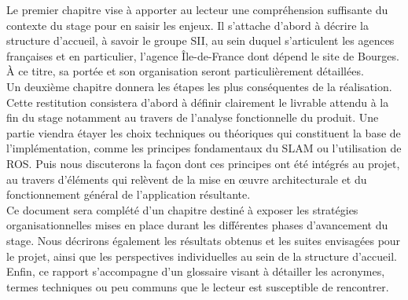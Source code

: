 Le premier chapitre vise à apporter au lecteur une compréhension suffisante du contexte du stage pour en saisir les enjeux. 
Il s'attache d'abord à décrire la structure d'accueil, à savoir le groupe \gls{SII}, au sein duquel s'articulent les agences françaises et en particulier, l'agence \^{I}le-de-France
dont dépend le site de Bourges. 
\`{A} ce titre, sa portée et son organisation seront particulièrement détaillées. \\
Un deuxième chapitre donnera les étapes les plus conséquentes de la réalisation. 
Cette restitution consistera d'abord à définir clairement le livrable attendu à la fin du stage notamment au travers de l'analyse fonctionnelle du produit.
Une partie viendra étayer les choix techniques ou théoriques qui constituent la base de l'implémentation, comme les principes fondamentaux du \gls{SLAM} ou l'utilisation de \gls{ROS}. 
Puis nous discuterons la façon dont ces principes ont été intégrés au projet, au travers d'éléments qui relèvent de la mise en \oe{}uvre architecturale et du fonctionnement général de l'application résultante.\\
Ce document sera complété d'un chapitre destiné à exposer les stratégies organisationnelles mises en place durant les différentes phases d'avancement du stage. 
Nous décrirons également les résultats obtenus et les suites envisagées pour le projet, ainsi que les perspectives individuelles au sein de la structure d'accueil. \\
Enfin, ce rapport s'accompagne d'un glossaire visant à détailler les acronymes, termes techniques ou peu communs que le lecteur est susceptible de rencontrer. 